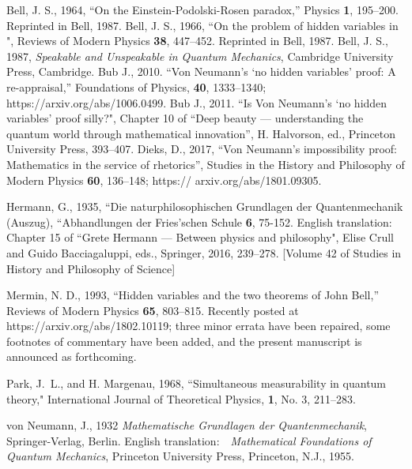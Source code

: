 \bigskip
{}


\medskip\ni
Bell, J. S., 1964, ``On the Einstein-Podolski-Rosen paradox,'' Physics {\bf 1}, 195--200.   Reprinted in Bell, 1987.
\medskip\ni
Bell, J. S., 1966, ``On the problem of hidden variables in \qm", Reviews of Modern Physics {\bf 38}, 447--452.  Reprinted in Bell, 1987.
\medskip
\ni
Bell, J. S., 1987, {\it Speakable and Unspeakable in Quantum Mechanics\/},
Cambridge University Press, Cambridge.
\medskip
\ni
Bub J., 2010. ``Von Neumann's `no hidden variables' proof: A re-appraisal,'' Foundations of Physics, {\bf 40},  1333--1340; https://arxiv.org/abs/1006.0499.
\medskip
\ni
Bub J., 2011. ``Is Von Neumann's `no hidden
variables' proof silly?", Chapter 10 of ``Deep beauty --- 
understanding the quantum world through mathematical innovation'', H. Halvorson, ed., Princeton University Press, 
393--407.
\medskip
\ni
Dieks, D., 2017, ``Von Neumann's impossibility proof: Mathematics
in the service of rhetorics'', Studies in the History and Philosophy of Modern Physics {\bf 60},    136--148;
https:// arxiv.org/abs/1801.09305. 

\medskip
\ni
Hermann, G., 1935, ``Die naturphilosophischen Grundlagen der Quantenmechanik
(Aus\-zug), ``Abhandlungen der Fries'schen Schule {\bf 6}, 75-152.  English translation:  Chapter 15 of 
``Grete Hermann --- Between physics and philosophy", Elise Crull and Guido Bacciagaluppi, eds., Springer, 2016, 239--278.    [Volume 42 of Studies in History and Philosophy of Science]

\medskip
\ni
Mermin, N. D., 1993, ``Hidden variables and the two theorems of John Bell,''
Reviews of Modern Physics {\bf 65}, 803--815.  
Recently posted at https://arxiv.org/abs/1802.10119; three minor errata have been repaired, some footnotes of commentary have been added, and the present manuscript is announced as forthcoming.     

\medskip
\ni  Park, J.~L., and H. Margenau, 1968, ``Simultaneous measurability in quantum theory," 
International Journal of Theoretical Physics, {\bf 1}, No. 3, 211--283.

\medskip 
\ni
von Neumann, J., 1932 {\it Mathematische Grundlagen der Quantenmechanik\/},
Springer-Ver\-lag, Berlin.  English translation:\ \  {\it Mathematical Foundations
of Quantum Mechanics\/}, Princeton University Press, Princeton, N.J., 1955.

\bye

